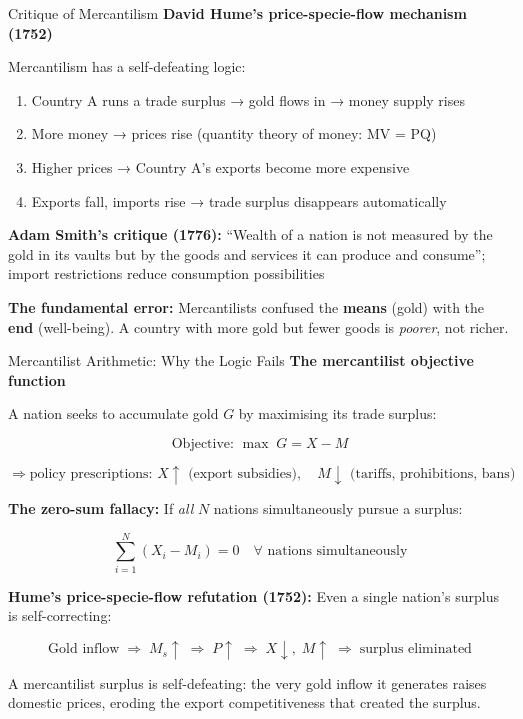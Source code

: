 \documentclass[
  ignorenonframetext,
  aspectratio=169,
]{beamer}
\makeatletter
\providecommand{\tightlist}{%
  \setlength{\itemsep}{0pt}\setlength{\parskip}{0pt}}
\let\quarto@originallabel\label
\DeclareRobustCommand*{\label}[1]{\quarto@originallabel{#1}}
\makeatother
\begin{document}
\begin{frame}{Critique of Mercantilism}
\label{critique-of-mercantilism}
\textbf{David Hume's price-specie-flow mechanism (1752)}

Mercantilism has a self-defeating logic:

\begin{enumerate}
\tightlist
\item
  Country A runs a trade surplus → gold flows in → money supply rises
\item
  More money → prices rise (quantity theory of money: MV = PQ)
\item
  Higher prices → Country A's exports become more expensive
\item
  Exports fall, imports rise → trade surplus disappears automatically
\end{enumerate}

\textbf{Adam Smith's critique (1776):} ``Wealth of a nation is not
measured by the gold in its vaults but by the goods and services it can
produce and consume''; import restrictions reduce consumption
possibilities

\textbf{The fundamental error:} Mercantilists confused the
\textbf{means} (gold) with the \textbf{end} (well-being). A country with
more gold but fewer goods is \emph{poorer}, not richer.

\end{frame}

\begin{frame}{Mercantilist Arithmetic: Why the Logic Fails}
\label{mercantilist-arithmetic-why-the-logic-fails}
\textbf{The mercantilist objective function}

A nation seeks to accumulate gold \(G\) by maximising its trade surplus:

\[\text{Objective: } \max\; G = X - M\]

\[\Rightarrow \text{policy prescriptions: } X \uparrow \text{ (export subsidies)}, \quad M \downarrow \text{ (tariffs, prohibitions, bans)}\]

\textbf{The zero-sum fallacy:} If \emph{all} \(N\) nations
simultaneously pursue a surplus:

\[\sum_{i=1}^{N}(X_i - M_i) = 0 \quad \forall \text{ nations simultaneously}\]

\textbf{Hume's price-specie-flow refutation (1752):} Even a single
nation's surplus is self-correcting:

\[\text{Gold inflow} \;\Rightarrow\; M_s \uparrow \;\Rightarrow\; P \uparrow \;\Rightarrow\; X \downarrow,\; M \uparrow \;\Rightarrow\; \text{surplus eliminated}\]

A mercantilist surplus is self-defeating: the very gold inflow it
generates raises domestic prices, eroding the export competitiveness
that created the surplus.
\end{frame}
\end{document}
